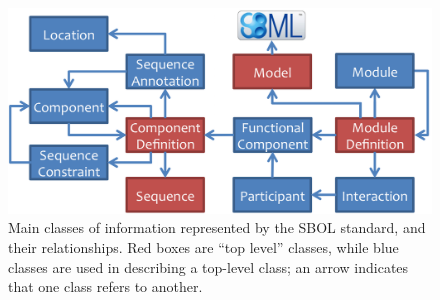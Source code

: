\begin{figure}[ht]
\begin{center}
\includegraphics[scale=1.2]{images/SBOL2_2_revised.png}
\caption{Main classes of information represented by the SBOL standard, and their relationships.  Red boxes are ``top level'' classes, while blue classes are used in describing a top-level class; an arrow indicates that one class refers to another.}
\label{images:overview2}
\end{center}
\end{figure}



